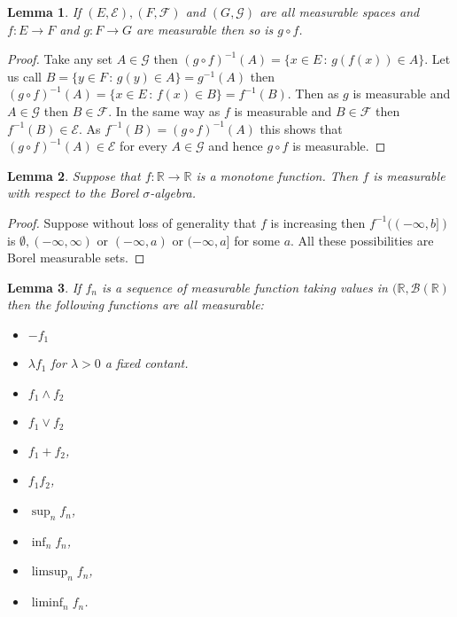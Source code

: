 \documentclass[
]{book}
\providecommand{\tightlist}{%
  \setlength{\itemsep}{0pt}\setlength{\parskip}{0pt}}
\newtheorem{lemma}{Lemma}[chapter]
\theoremstyle{definition}
\theoremstyle{definition}
\theoremstyle{definition}
\theoremstyle{definition}
\theoremstyle{remark}
\begin{document}
\begin{lemma}
If \((E, \mathcal{E}), (F, \mathcal{F})\) and \((G, \mathcal{G})\) are all measurable spaces and \(f : E \rightarrow F\) and \(g: F \rightarrow G\) are measurable then so is \(g \circ f\).
\end{lemma}

\begin{proof}
Take any set \(A \in \mathcal{G}\) then \((g\circ f)^{-1}(A) = \{ x \in E \,:\, g(f(x)) \in A\}\). Let us call \(B = \{y \in F \,:\, g(y) \in A\} = g^{-1}(A)\) then \((g \circ f)^{-1}(A) = \{ x \in E \,:\, f(x) \in B\} = f^{-1}(B)\). Then as \(g\) is measurable and \(A \in \mathcal{G}\) then \(B \in \mathcal{F}\). In the same way as \(f\) is measurable and \(B \in \mathcal{F}\) then \(f^{-1}(B) \in \mathcal{E}\). As \(f^{-1}(B) = (g \circ f)^{-1}(A)\) this shows that \((g \circ f)^{-1}(A) \in \mathcal{E}\) for every \(A \in \mathcal{G}\) and hence \(g \circ f\) is measurable.
\end{proof}

\begin{lemma}
Suppose that \(f: \mathbb{R} \rightarrow \mathbb{R}\) is a monotone function. Then \(f\) is measurable with respect to the Borel \(\sigma\)-algebra.
\end{lemma}

\begin{proof}
Suppose without loss of generality that \(f\) is increasing then \(f^{-1}((-\infty, b])\) is \(\emptyset, (-\infty, \infty)\) or \((-\infty, a)\) or \((-\infty, a]\) for some \(a\). All these possibilities are Borel measurable sets.
\end{proof}

\begin{lemma}

If \(f_n\) is a sequence of measurable function taking values in \((\mathbb{R}, \mathcal{B}(\mathbb{R})\) then the following functions are all measurable:

\begin{itemize}
\tightlist
\item
  \(-f_1\)
\item
  \(\lambda f_1\) for \(\lambda >0\) a fixed contant.
\item
  \(f_1 \wedge f_2\)
\item
  \(f_1 \vee f_2\)
\item
  \(f_1+f_2\),
\item
  \(f_1 f_2\),
\item
  \(\sup_n f_n\),
\item
  \(\inf_n f_n\),
\item
  \(\limsup_n f_n\),
\item
  \(\liminf_n f_n\).
\end{itemize}

\end{lemma}
\end{document}
